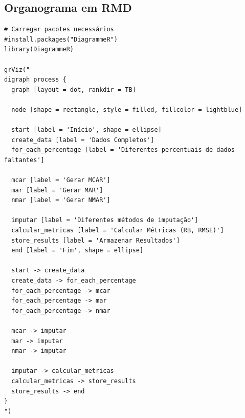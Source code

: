 \documentclass[11pt]{article}
\begin{document}
\subsection*{Organograma em RMD}
\begin{verbatim}
# Carregar pacotes necessários
#install.packages("DiagrammeR")
library(DiagrammeR)
 
grViz("
digraph process {
  graph [layout = dot, rankdir = TB]
  
  node [shape = rectangle, style = filled, fillcolor = lightblue]
  
  start [label = 'Início', shape = ellipse]
  create_data [label = 'Dados Completos']
  for_each_percentage [label = 'Diferentes percentuais de dados faltantes']
  
  mcar [label = 'Gerar MCAR']
  mar [label = 'Gerar MAR']
  nmar [label = 'Gerar NMAR']
  
  imputar [label = 'Diferentes métodos de imputação']
  calcular_metricas [label = 'Calcular Métricas (RB, RMSE)']
  store_results [label = 'Armazenar Resultados']
  end [label = 'Fim', shape = ellipse]
  
  start -> create_data
  create_data -> for_each_percentage
  for_each_percentage -> mcar
  for_each_percentage -> mar
  for_each_percentage -> nmar
  
  mcar -> imputar
  mar -> imputar
  nmar -> imputar
  
  imputar -> calcular_metricas
  calcular_metricas -> store_results
  store_results -> end
}
")
\end{verbatim}
\end{document}
